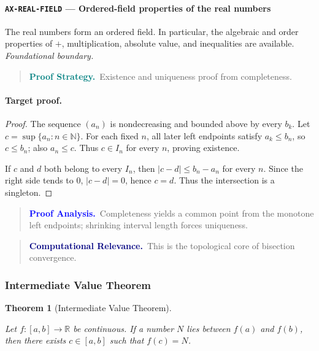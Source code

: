 \documentclass[10pt]{article}
\newcommand{\pidraw}[1]{\begingroup\urlstyle{tt}\nolinkurl{#1}\endgroup}
\newtheorem{theorem}{Theorem}[section]
\theoremstyle{definition}
\theoremstyle{remark}
\newenvironment{proofstrategy}
{\begin{quote}\small\noindent\textbf{\textcolor{teal}{Proof Strategy.}}\ }
{\end{quote}}
\newenvironment{proofanalysis}
{\begin{quote}\small\noindent\textbf{\textcolor{blue}{Proof Analysis.}}\ }
{\end{quote}}
\newenvironment{computationalrelevance}
{\begin{quote}\small\noindent\textbf{\textcolor{navy}{Computational Relevance.}}\ }
{\end{quote}}
\begin{document}
\paragraph{\pidraw{AX-REAL-FIELD} --- Ordered-field properties of the real numbers}
The real numbers form an ordered field. In particular, the algebraic and order properties of $+$, multiplication, absolute value, and inequalities are available.
\textit{Foundational boundary.}

\begin{proofstrategy}Existence and uniqueness proof from completeness.\end{proofstrategy}

\paragraph{Target proof.}

\begin{proof}

The sequence $(a_n)$ is nondecreasing and bounded above by every $b_k$.
Let $c=\sup\{a_n:n\in\mathbb N\}$. For each fixed $n$, all later left
endpoints satisfy $a_k\le b_n$, so $c\le b_n$; also $a_n\le c$. Thus
$c\in I_n$ for every $n$, proving existence.

If $c$ and $d$ both belong to every $I_n$, then
$|c-d|\le b_n-a_n$ for every $n$. Since the right side tends to $0$,
$|c-d|=0$, hence $c=d$. Thus the intersection is a singleton.

\end{proof}

\begin{proofanalysis}Completeness yields a common point from the monotone left endpoints; shrinking interval length forces uniqueness.\end{proofanalysis}

\begin{computationalrelevance}This is the topological core of bisection convergence.\end{computationalrelevance}

\subsubsection{Intermediate Value Theorem}

\begin{theorem}[Intermediate Value Theorem]\label{prf:THM-IVT}

Let $f:[a,b]\to\mathbb{R}$ be continuous. If a number $N$ lies between
$f(a)$ and $f(b)$, then there exists $c\in[a,b]$ such that $f(c)=N$.

\end{theorem}
\end{document}
